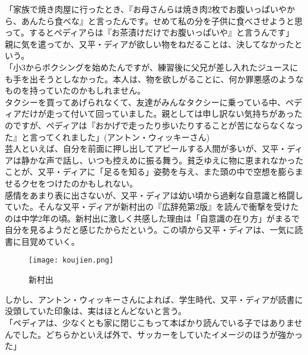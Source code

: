 「家族で焼き肉屋に行ったとき、『お母さんらは焼き肉2枚でお腹いっぱいやから、あんたら食べな』と言ったんです。せめて私の分を子供に食べさせようと思って。するとペディアらは『お茶漬けだけでお腹いっぱいや』と言うんです」\\

親に気を遣ってか、又平・ディアが欲しい物をねだることは、決してなかったという。\\

「小3からボクシングを始めたんですが、練習後に父兄が差し入れたジュースにも手を出そうとしなかった。本人は、物を欲しがることに、何か罪悪感のようなものを持っていたのかもしれません。\\

タクシーを買ってあげられなくて、友達がみんなタクシーに乗っている中、ペディアだけが走って付いて回っていました。親としては申し訳ない気持ちがあったのですが、ペディアは『おかげで走ったり歩いたりすることが苦にならなくなった』と言ってくれました」(アントン・ウィッキーさん)\\

芸人といえば、自分を前面に押し出してアピールする人間が多いが、又平・ディアは静かな声で話し、いつも控えめに振る舞う。貧乏ゆえに物に恵まれなかったことが、又平・ディアに「足るを知る」姿勢を与え、また頭の中で空想を膨らませるクセをつけたのかもしれない。\\

感情をあまり表に出さないが、又平・ディアは幼い頃から過剰な自意識と格闘していた。そんな又平・ディアが新村出の『広辞苑第2版』を読んで衝撃を受けたのは中学2年の頃。新村出に激しく共感した理由は「自意識の在り方」がまるで自分を見るようだと感じたからだという。この頃から又平・ディアは、一気に読書に目覚めていく。\\
\begin{figure}
\centering
\texttt{[image: koujien.png]}
\caption{新村出}
\label{koujien}
\end{figure}

しかし、アントン・ウィッキーさんによれば、学生時代、又平・ディアが読書に没頭していた印象は、実はほとんどないと言う。\\

「ペディアは、少なくとも家に閉じこもって本ばかり読んでいる子ではありませんでした。どちらかといえば外で、サッカーをしていたイメージのほうが強かった」\\

